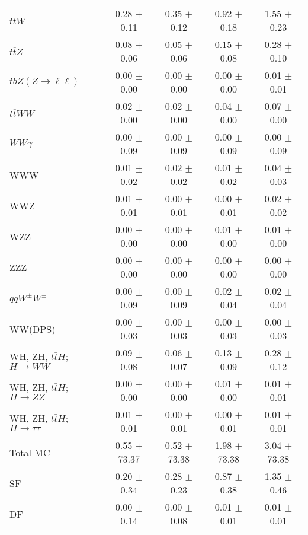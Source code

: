 \begin{tabular}{l|cccc}
                   $t\overline{t}W$ &  0.28 $\pm$  0.11 &  0.35 $\pm$  0.12 &  0.92 $\pm$  0.18 &  1.55 $\pm$  0.23 \\
                   $t\overline{t}Z$ &  0.08 $\pm$  0.06 &  0.05 $\pm$  0.06 &  0.15 $\pm$  0.08 &  0.28 $\pm$  0.10 \\
    $tbZ (Z \rightarrow \ell \ell)$ &  0.00 $\pm$  0.00 &  0.00 $\pm$  0.00 &  0.00 $\pm$  0.00 &  0.01 $\pm$  0.01 \\
                  $t\overline{t}WW$ &  0.02 $\pm$  0.00 &  0.02 $\pm$  0.00 &  0.04 $\pm$  0.00 &  0.07 $\pm$  0.00 \\
                         $WW\gamma$ &  0.00 $\pm$  0.09 &  0.00 $\pm$  0.09 &  0.00 $\pm$  0.09 &  0.00 $\pm$  0.09 \\
                                WWW &  0.01 $\pm$  0.02 &  0.02 $\pm$  0.02 &  0.01 $\pm$  0.02 &  0.04 $\pm$  0.03 \\
                                WWZ &  0.01 $\pm$  0.01 &  0.00 $\pm$  0.01 &  0.00 $\pm$  0.01 &  0.02 $\pm$  0.02 \\
                                WZZ &  0.00 $\pm$  0.00 &  0.00 $\pm$  0.00 &  0.01 $\pm$  0.00 &  0.01 $\pm$  0.00 \\
                                ZZZ &  0.00 $\pm$  0.00 &  0.00 $\pm$  0.00 &  0.00 $\pm$  0.00 &  0.00 $\pm$  0.00 \\
                 $qqW^{\pm}W^{\pm}$ &  0.00 $\pm$  0.09 &  0.00 $\pm$  0.09 &  0.02 $\pm$  0.04 &  0.02 $\pm$  0.04 \\
                            WW(DPS) &  0.00 $\pm$  0.03 &  0.00 $\pm$  0.03 &  0.00 $\pm$  0.03 &  0.00 $\pm$  0.03 \\
WH, ZH, $t\bar{t}H$; $H \rightarrow WW$ &  0.09 $\pm$  0.08 &  0.06 $\pm$  0.07 &  0.13 $\pm$  0.09 &  0.28 $\pm$  0.12 \\
WH, ZH, $t\bar{t}H$; $H \rightarrow ZZ$ &  0.00 $\pm$  0.00 &  0.00 $\pm$  0.00 &  0.01 $\pm$  0.00 &  0.01 $\pm$  0.01 \\
WH, ZH, $t\bar{t}H$; $H \rightarrow \tau\tau$ &  0.01 $\pm$  0.01 &  0.00 $\pm$  0.01 &  0.00 $\pm$  0.01 &  0.01 $\pm$  0.01 \\
\hline\hline
                           Total MC &  0.55 $\pm$ 73.37 &  0.52 $\pm$ 73.38 &  1.98 $\pm$ 73.38 &  3.04 $\pm$ 73.38 \\
\hline
                                 SF &  0.20 $\pm$  0.34 &  0.28 $\pm$  0.23 &  0.87 $\pm$  0.38 &  1.35 $\pm$  0.46 \\
                                 DF &  0.00 $\pm$  0.14 &  0.00 $\pm$  0.08 &  0.01 $\pm$  0.01 &  0.01 $\pm$  0.01 \\

\end{tabular}
